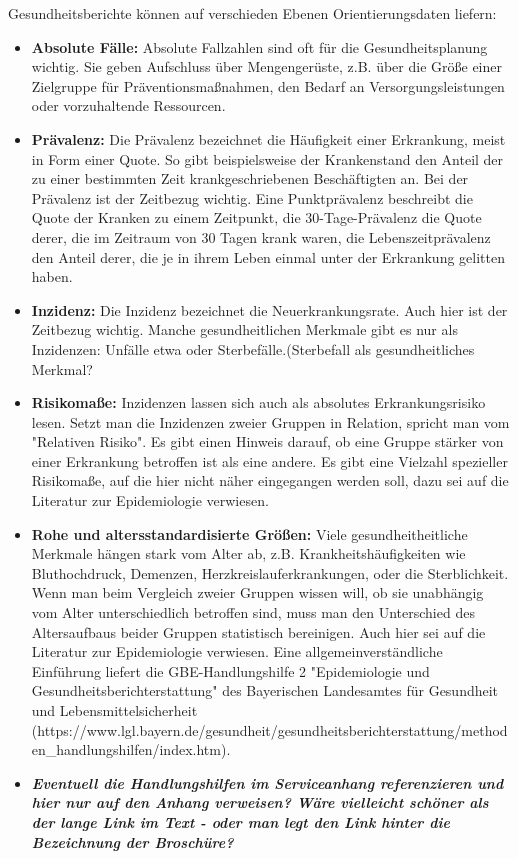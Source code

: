 \documentclass{article}
\begin{document}
Gesundheitsberichte können auf verschieden Ebenen Orientierungsdaten liefern:

\begin{itemize}
\item \textbf{Absolute Fälle:} Absolute Fallzahlen sind oft für die Gesundheitsplanung wichtig. Sie geben Aufschluss über Mengengerüste, z.B. über die Größe einer Zielgruppe für Präventionsmaßnahmen, den Bedarf an Versorgungsleistungen oder vorzuhaltende Ressourcen.


\item \textbf{Prävalenz: }Die Prävalenz bezeichnet die Häufigkeit einer Erkrankung, meist in Form einer Quote. So gibt beispielsweise der Krankenstand den Anteil der zu einer bestimmten Zeit krankgeschriebenen Beschäftigten an. Bei der Prävalenz ist der Zeitbezug wichtig. Eine Punktprävalenz beschreibt die Quote der Kranken zu einem Zeitpunkt, die 30-Tage-Prävalenz die Quote derer, die im Zeitraum von 30 Tagen krank waren, die Lebenszeitprävalenz den Anteil derer, die je in ihrem Leben einmal unter der Erkrankung gelitten haben.


\item \textbf{Inzidenz: }Die Inzidenz bezeichnet die Neuerkrankungsrate. Auch hier ist der Zeitbezug wichtig. Manche gesundheitlichen Merkmale gibt es nur als Inzidenzen: Unfälle etwa oder Sterbefälle.(Sterbefall als gesundheitliches Merkmal? 


\item \textbf{Risikomaße:} Inzidenzen lassen sich auch als absolutes Erkrankungsrisiko lesen. Setzt man die Inzidenzen zweier Gruppen in Relation, spricht man vom "Relativen Risiko". Es gibt einen Hinweis darauf, ob eine Gruppe stärker von einer Erkrankung betroffen ist als eine andere. Es gibt eine Vielzahl spezieller Risikomaße, auf die hier nicht näher eingegangen werden soll, dazu sei auf die Literatur zur Epidemiologie verwiesen.


\item \textbf{Rohe und altersstandardisierte Größen:} Viele gesundheitheitliche Merkmale hängen stark vom Alter ab, z.B. Krankheitshäufigkeiten wie Bluthochdruck, Demenzen, Herzkreislauferkrankungen, oder die Sterblichkeit. Wenn man beim Vergleich zweier Gruppen wissen will, ob sie unabhängig vom Alter unterschiedlich betroffen sind, muss man den Unterschied des Altersaufbaus beider Gruppen statistisch bereinigen. Auch hier sei auf die Literatur zur Epidemiologie verwiesen. Eine allgemeinverständliche Einführung liefert die GBE-Handlungshilfe 2 "Epidemiologie und Gesundheitsberichterstattung" des Bayerischen Landesamtes für Gesundheit und Lebensmittelsicherheit (https://www.lgl.bayern.de/gesundheit/gesundheitsberichterstattung/methoden\_handlungshilfen/index.htm).  


\item \emph{\textbf{Eventuell die Handlungshilfen im Serviceanhang referenzieren und hier nur auf den Anhang verweisen? Wäre vielleicht schöner als der lange Link im Text - oder man legt den Link hinter die Bezeichnung der Broschüre?}}


\end{itemize}
\end{document}

